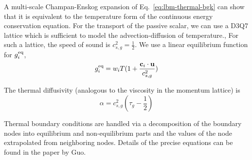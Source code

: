 A multi-scale Champan-Enskog expansion of Eq.~\ref{eq:lbm-thermal-bgk} can show that it is equivalent to the temperature form of the continuous energy conservation equation.\cite{Guo2002} For the transport of the passive scalar, we can use a D3Q7 lattice which is sufficient to model the advection-diffusion of temperature.\cite{Latt2007,Parmigiani2011}, For such a lattice, the speed of sound is $c^2_{s,g} = \frac{1}{2}$. We use a linear equilibrium function for $g_i^{\text{eq}}$,
\begin{equation}
	g_i^{\text{eq}} = w_i T (1+\frac{\mathbf{c}_i\cdot\mathbf{u}}{c_{s,g}^2})
\end{equation}

The thermal diffusivity (analogous to the viscosity in the momentum lattice) is 
\begin{equation}
	\alpha = c_{s,g}^2(\tau_{g} - \frac{1}{2})
\end{equation}

Thermal boundary conditions are handled via a decomposition of the boundary nodes into equilibrium and non-equilibrium parts and the values of the node extrapolated from neighboring nodes. Details of the precise equations can be found in the paper by Guo\etal.\cite{Guo2002}


